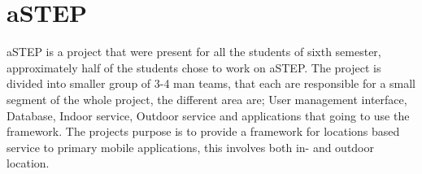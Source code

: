 \section{aSTEP}
aSTEP is a project that were present for all the students of sixth semester, approximately half of the students chose to work on aSTEP. The project is divided into smaller group of 3-4 man teams, that each are responsible for a small segment of the whole project, the different area are; User management interface, Database, Indoor service, Outdoor service and applications that going to use the framework. The projects purpose is to provide a framework for locations based service to primary mobile applications, this involves both in- and outdoor location.